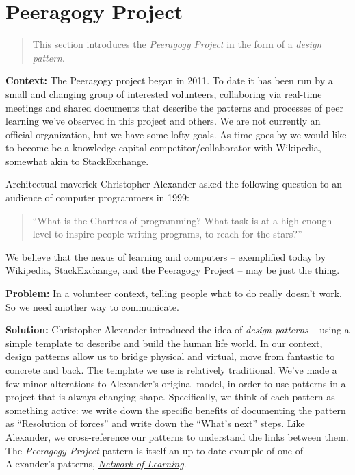 \section{Peeragogy Project}

\begin{quote}
This section introduces the \emph{Peeragogy Project} in the form of a \emph{design pattern}.
\end{quote}

\textbf{Context:}  The Peeragogy project began in 2011.  To date it has been run by a small and changing group of interested volunteers, collaboring via real-time meetings and shared documents that describe the patterns and processes of peer learning we've observed in this project and others.   We are not currently an official organization, but we have some lofty goals.  As time goes by we would like to become be a knowledge capital competitor/collaborator with Wikipedia, somewhat akin to StackExchange.

Architectual maverick Christopher Alexander asked the following question to an audience of computer programmers in 1999: 
\begin{quote}
``What is the Chartres of programming? What task is at a high enough level to inspire people writing programs, to reach for the stars?''
\end{quote}
We believe that the nexus of learning and computers -- exemplified today by Wikipedia, StackExchange, and the Peeragogy Project -- may be just the thing.

\textbf{Problem:} In a volunteer context, telling people what to do really doesn't work.  So we need another way to communicate.

\textbf{Solution:} Christopher Alexander introduced the idea of \emph{design patterns} -- using a simple template to describe and build the human life world.  In our context, design patterns allow us to bridge physical and virtual, move from fantastic to concrete and back.  The template we use is relatively traditional.  We've made a few minor alterations to Alexander's original model, in order to use patterns in a project that is always changing shape.  Specifically, we think of each pattern as something active: we write down the specific benefits of documenting the pattern as ``Resolution of forces'' and write down the ``What's next'' steps.  Like Alexander, we cross-reference our patterns to understand the links between them.  The \emph{Peeragogy Project} pattern is itself an up-to-date example of one of Alexander's patterns, \href{http://en.wikipedia.org/wiki/Networked_learning#1970s}{\emph{Network of Learning}}.

